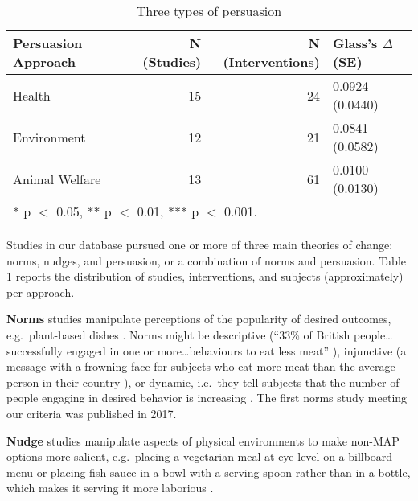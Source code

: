 \documentclass[sn-nature,pdflatex]{sn-jnl}
\begin{document}
\begin{table}[!h]
\centering
\caption{\label{tab:tab:table_two}Three types of persuasion}
\centering
\begin{tabular}[t]{lrrl}
\toprule
Persuasion Approach & N (Studies) & N (Interventions) & Glass's $\Delta$ (SE)\\
\midrule
Health & 15 & 24 & 0.0924 (0.0440)\\
Environment & 12 & 21 & 0.0841 (0.0582)\\
Animal Welfare & 13 & 61 & 0.0100 (0.0130)\\
\bottomrule
\multicolumn{4}{l}{\rule{0pt}{1em}* p $<$ 0.05, ** p $<$ 0.01, *** p $<$ 0.001.}\\
\end{tabular}
\end{table}

Studies in our database pursued one or more of three main theories of
change: norms, nudges, and persuasion, or a combination of norms and
persuasion. Table 1 reports the distribution of studies, interventions,
and subjects (approximately) per approach.

\textbf{Norms} studies
\citep{aldoh2023, allen2002, alblas2023, coker2022, griesoph2021, piester2020, sparkman2017, sparkman2020}
manipulate perceptions of the popularity of desired outcomes,
e.g.~plant-based dishes \citep{sparkman2017}. Norms might be descriptive
(``33\% of British people\ldots successfully engaged in one or
more\ldots behaviours to eat less meat'' \citep{aldoh2023}), injunctive
(a message with a frowning face for subjects who eat more meat than the
average person in their country \citep{alblas2023}), or dynamic,
i.e.~they tell subjects that the number of people engaging in desired
behavior is increasing
\citep{aldoh2023, coker2022, sparkman2017, sparkman2020}. The first
norms study meeting our criteria was published in 2017.

\textbf{Nudge} studies \citep{andersson2021, kanchanachitra2020}
manipulate aspects of physical environments to make non-MAP options more
salient, e.g.~placing a vegetarian meal at eye level on a billboard menu
\citep{anderson2021} or placing fish sauce in a bowl with a serving
spoon rather than in a bottle, which makes it serving it more laborious
\citep{kanchanachitra2020}.
\end{document}

